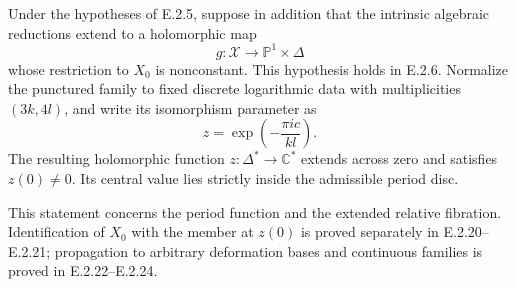 \begin{proposition}
Under the hypotheses of E.2.5, suppose in addition that the
intrinsic algebraic reductions extend to a holomorphic map
\[
 g:\mathcal X\longrightarrow\mathbb P^1\times\Delta
\]
whose restriction to $X_0$ is nonconstant.  This hypothesis
holds in E.2.6.  Normalize the punctured family to fixed
discrete logarithmic data with multiplicities $(3k,4l)$, and
write its isomorphism parameter as
\[
 z=\exp\!\left(-\frac{\pi i c}{kl}\right).
\]
The resulting holomorphic function $z:\Delta^*\to\mathbb C^*$
extends across zero and satisfies $z(0)\ne0$.  Its central
value lies strictly inside the admissible period disc.

This statement concerns the period function and the extended
relative fibration.  Identification of $X_0$ with the member
at $z(0)$ is proved separately in E.2.20--E.2.21; propagation
to arbitrary deformation bases and continuous families is
proved in E.2.22--E.2.24.
\end{proposition}

